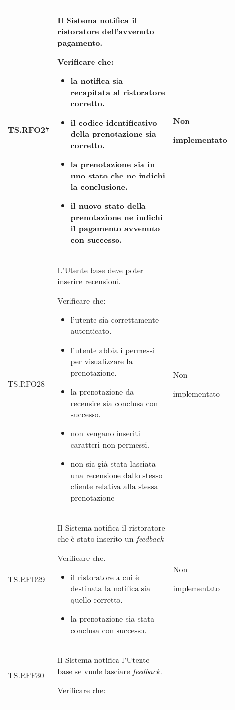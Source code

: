 \begin{longtable}{|p{0.10\linewidth}|p{0.70\linewidth}|p{0.12\linewidth}|}
    TS.RFO27 & 
    Il Sistema notifica il ristoratore dell’avvenuto pagamento.   \par 
    Verificare che: 
    \begin{itemize}
        \item la notifica sia recapitata al ristoratore corretto.
        \item il codice identificativo della prenotazione sia corretto.
        \item la prenotazione sia in uno stato che ne indichi la conclusione.
        \item il nuovo stato della prenotazione ne indichi il pagamento avvenuto con successo.
    \end{itemize}&
    Non \par implementato  \\
    \hline
    TS.RFO28 & 
    L’Utente base deve poter inserire recensioni.   \par 
    Verificare che: 
    \begin{itemize}
        \item l'utente sia correttamente autenticato.
        \item l'utente abbia i permessi per visualizzare la prenotazione.
        \item la prenotazione da recensire sia conclusa con successo.
        \item non vengano inseriti caratteri non permessi.
        \item non sia già stata lasciata una recensione dallo stesso cliente relativa alla stessa prenotazione
    \end{itemize}&
    Non \par implementato  \\
    \hline
    TS.RFD29 & 
    Il Sistema notifica il ristoratore che è stato inserito un \textit{feedback}   \par 
    Verificare che: 
    \begin{itemize}
        \item il ristoratore a cui è destinata la notifica sia quello corretto.
        \item la prenotazione sia stata conclusa con successo.
    \end{itemize}&
    Non \par implementato  \\
    \hline
    TS.RFF30 & 
    Il Sistema notifica l’Utente base se vuole lasciare \textit{feedback}.\par 
    Verificare che: 
    \begin{itemize}

\end{itemize}
\end{longtable}
